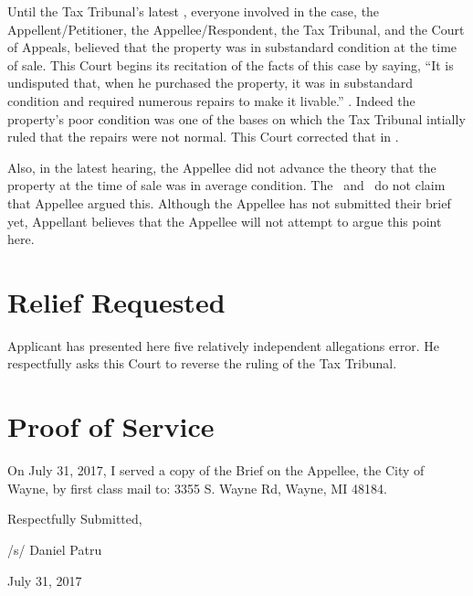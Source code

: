 \documentclass[12pt,\documentclassflag]{michiganCourtOfAppealsBrief}
\begin{document}
Until the Tax Tribunal's latest \FOJ, everyone involved in the case, the Appellent/Petitioner, the Appellee/Respondent, the Tax Tribunal, and the Court of Appeals, believed that the property was in substandard condition at the time of sale. This Court begins its recitation of the facts of this case by saying, ``It is undisputed that, when he purchased the property, it was in substandard condition and required numerous repairs to make it livable.'' . Indeed the property's poor condition was one of the bases on which the Tax Tribunal intially ruled that the repairs were not normal. This Court corrected that in \cite[s]{Patru}.

Also, in the latest hearing, the Appellee did not advance the theory that the property at the time of sale was in average condition. The \FOJ\ and \orderDenying\ do not claim that Appellee argued this. Although the Appellee has not submitted their brief yet, Appellant believes that the Appellee will not attempt to argue this point here. 

\section{Relief Requested}

Applicant has presented here five relatively independent allegations error. He respectfully asks this Court to reverse the ruling of the Tax Tribunal. 

\section{Proof of Service}

On July 31, 2017, I served a copy of the Brief on the Appellee, the City of Wayne, by first class mail to: 3355 S. Wayne Rd, Wayne, MI 48184. 


\vspace{1\baselineskip}

{ \setlength{\leftskip}{3.5in}

  Respectfully Submitted,

  /s/ Daniel Patru

  July 31, 2017

  \setlength{\leftskip}{0pt}}

\newpage\empty%
\end{document}
